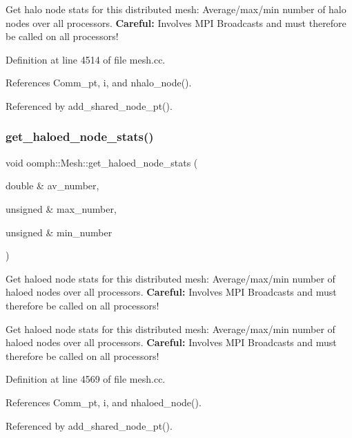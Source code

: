 Get halo node stats for this distributed mesh\+: Average/max/min number of halo nodes over all processors. {\bfseries Careful\+:} Involves M\+PI Broadcasts and must therefore be called on all processors! 

Definition at line 4514 of file mesh.\+cc.



References Comm\+\_\+pt, i, and nhalo\+\_\+node().



Referenced by add\+\_\+shared\+\_\+node\+\_\+pt().

\mbox{\label{classoomph_1_1Mesh_a4f7b8beffb9f4b5f95842edf4d8af4c6}} 
\subsubsection{\texorpdfstring{get\+\_\+haloed\+\_\+node\+\_\+stats()}{get\_haloed\_node\_stats()}}
{\footnotesize\ttfamily void oomph\+::\+Mesh\+::get\+\_\+haloed\+\_\+node\+\_\+stats (\begin{DoxyParamCaption}\item[{double \&}]{av\+\_\+number,  }\item[{unsigned \&}]{max\+\_\+number,  }\item[{unsigned \&}]{min\+\_\+number }\end{DoxyParamCaption})}



Get haloed node stats for this distributed mesh\+: Average/max/min number of haloed nodes over all processors. {\bfseries Careful\+:} Involves M\+PI Broadcasts and must therefore be called on all processors! 

Get haloed node stats for this distributed mesh\+: Average/max/min number of haloed nodes over all processors. {\bfseries Careful\+:} Involves M\+PI Broadcasts and must therefore be called on all processors! 

Definition at line 4569 of file mesh.\+cc.



References Comm\+\_\+pt, i, and nhaloed\+\_\+node().



Referenced by add\+\_\+shared\+\_\+node\+\_\+pt().

